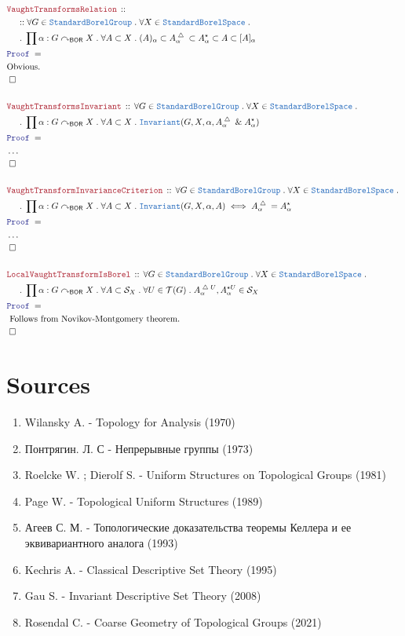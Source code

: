 \documentclass[12pt]{scrartcl}
\newcommand{\TYPE}[1]{\textcolor{NavyBlue}{\mathtt{#1}}}
\newcommand{\LOGIC}[1]{\textcolor{Blue}{\mathtt{#1}}}
\newcommand{\THM}[1]{\textcolor{Maroon}{\mathtt{#1}}}
\renewcommand{\.}{\; . \;}
\newcommand{\Theorem}[2]{& \THM{#1} \, :: \, #2 \\ & \Proof = \\ }
\newcommand{\NewLine}{\\ & \kern 1pc}
\newcommand{\Page}[1]{ \begin{align*} #1 \end{align*}   }
\newcommand{\NoProof}{ & \ldots \\ \EndProof}
\newcommand{\Explain}[1]{& \text{#1.} \\}
\renewcommand{\And}{\; \& \;}
\newcommand{\du}{\; \triangle \;}
\newcommand{\QED}{\; \square}
\newcommand{\EndProof}{& \QED \\}
\newcommand{\Proof}{\LOGIC{Proof} \; }
\newcommand{\T}{\mathcal{T}}
\newcommand{\SBS}{\TYPE{StandardBorelSpace}}
\newcommand{\BOR}{\mathsf{BOR}}
\renewcommand{\S}{\mathcal{S}}
\newcommand{\ActOn}{\curvearrowright}
\newcommand{\SBG}{\TYPE{StandardBorelGroup}}
\renewcommand{\S}{\mathcal{S}}
\begin{document}
\Page{
	\Theorem{VaughtTransformsRelation}
	{
		\NewLine ::
		\forall G \in \SBG \. 
		\forall X \in \SBS \. \NewLine \.
		\prod \alpha : G \ActOn_\BOR X \.
		\forall A \subset X \.
		(A)_\alpha \subset A^{\du}_\alpha \subset A^{\star}_\alpha \subset  A \subset [A]_\alpha
	}
	\Explain{Obvious}
	\EndProof
	\\
	\Theorem{VaughtTransformsInvariant}
	{
		\forall G \in \SBG \. 
		\forall X \in \SBS \. \NewLine \.
		\prod \alpha : G \ActOn_\BOR X \.
		\forall A \subset X \.
		\TYPE{Invariant}( G,X,\alpha, A^{\du}_\alpha \And A^{\star}_\alpha )
 	}
	\NoProof
	\\
	\Theorem{VaughtTransformInvarianceCriterion}
	{
		\forall G \in \SBG \. 
		\forall X \in \SBS \. \NewLine \.
		\prod \alpha : G \ActOn_\BOR X \.
		\forall A \subset X \.
		\TYPE{Invariant}( G,X,\alpha, A)
		\iff
		A^{\du}_\alpha = A^{\star}_\alpha
	}
	\NoProof
	\\
	\Theorem{LocalVaughtTransformIsBorel}
	{
		\forall G \in \SBG \. 
		\forall X \in \SBS \. \NewLine \.
		\prod \alpha : G \ActOn_\BOR X \.
		\forall A \subset \S_X \.
		\forall U \in \T(G)   \.
		A^{\du U}_\alpha, A^{\star U}_\alpha \in \S_X
	}
	\Explain{ Follows from Novikov-Montgomery theorem}
	\EndProof
}
\newpage
\section*{Sources}
\begin{enumerate}
\item Wilansky A. - Topology for Analysis (1970) 
\item Понтрягин. Л. С - Непрерывные группы (1973)
\item Roelcke W. ; Dierolf S. - Uniform Structures on Topological Groups (1981) 
\item Page W. - Topological Uniform Structures (1989) 
\item Агеев С. М. - Топологические доказательства теоремы Келлера 
и ее эквивариантного аналога (1993)
\item Kechris A. - Classical Descriptive Set Theory (1995) 
\item Gau S.  - Invariant Descriptive Set Theory (2008) 
\item Rosendal C. - Coarse Geometry of Topological Groups (2021)
\end{enumerate}
\end{document}
